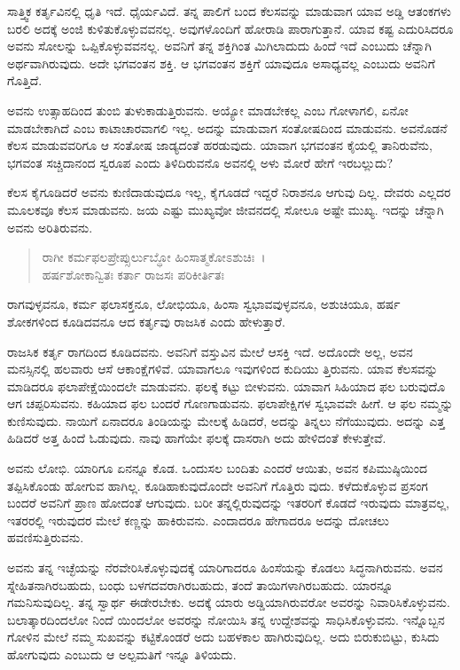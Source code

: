 ಸಾತ್ತ್ವಿಕ ಕರ್ತೃವಿನಲ್ಲಿ ಧೃತಿ ಇದೆ. ಧೈರ್ಯವಿದೆ. ತನ್ನ ಪಾಲಿಗೆ ಬಂದ ಕೆಲಸವನ್ನು ಮಾಡುವಾಗ ಯಾವ ಅಡ್ಡಿ ಆತಂಕಗಳು ಬರಲಿ ಅದಕ್ಕೆ ಅಂಜಿ ಕುಳಿತುಕೊಳ್ಳುವವನಲ್ಲ. ಅವುಗಳೊಂದಿಗೆ ಹೋರಾಡಿ ಪಾರಾಗುತ್ತಾನೆ. ಯಾವ ಕಷ್ಟ ಎದುರಿಸಿದರೂ ಅವನು ಸೋಲನ್ನು ಒಪ್ಪಿಕೊಳ್ಳುವವನಲ್ಲ. ಅವನಿಗೆ ತನ್ನ ಶಕ್ತಿಗಿಂತ ಮಿಗಿಲಾದುದು ಹಿಂದೆ ಇದೆ ಎಂಬುದು ಚೆನ್ನಾಗಿ ಅರ್ಥವಾಗಿರುವುದು. ಅದೇ ಭಗವಂತನ ಶಕ್ತಿ. ಆ ಭಗವಂತನ ಶಕ್ತಿಗೆ ಯಾವುದೂ ಅಸಾಧ್ಯವಲ್ಲ ಎಂಬುದು ಅವನಿಗೆ ಗೊತ್ತಿದೆ.

ಅವನು ಉತ್ಸಾಹದಿಂದ ತುಂಬಿ ತುಳುಕಾಡುತ್ತಿರುವನು. ಅಯ್ಯೋ ಮಾಡಬೇಕಲ್ಲ ಎಂಬ ಗೋಳಾಗಲಿ, ಏನೋ ಮಾಡಬೇಕಾಗಿದೆ ಎಂಬ ಕಾಟಾಚಾರವಾಗಲಿ ಇಲ್ಲ. ಅದನ್ನು ಮಾಡುವಾಗ ಸಂತೋಷದಿಂದ ಮಾಡುವನು. ಅವನೊಡನೆ ಕೆಲಸ ಮಾಡುವವರಿಗೂ ಆ ಸಂತೋಷ ಜಾಡ್ಯದಂತೆ ಹರಡುವುದು. ಯಾವಾಗ ಭಗವಂತನ ಕೈಯಲ್ಲಿ ತಾನಿರುವೆನು, ಭಗವಂತ ಸಚ್ಚಿದಾನಂದ ಸ್ವರೂಪ ಎಂದು ತಿಳಿದಿರುವನೊ ಅವನಲ್ಲಿ ಅಳು ಮೋರೆ ಹೇಗೆ ಇರಬಲ್ಲುದು?

ಕೆಲಸ ಕೈಗೂಡಿದರೆ ಅವನು ಕುಣಿದಾಡುವುದೂ ಇಲ್ಲ, ಕೈಗೂಡದೆ ಇದ್ದರೆ ನಿರಾಶನೂ ಆಗುವು ದಿಲ್ಲ. ದೇವರು ಎಲ್ಲದರ ಮೂಲಕವೂ ಕೆಲಸ ಮಾಡುವನು. ಜಯ ಎಷ್ಟು ಮುಖ್ಯವೋ ಜೀವನದಲ್ಲಿ ಸೋಲೂ ಅಷ್ಟೇ ಮುಖ್ಯ. ಇದನ್ನು ಚೆನ್ನಾಗಿ ಅವನು ಅರಿತಿರುವನು.

\begin{verse}
ರಾಗೀ ಕರ್ಮಫಲಪ್ರೇಪ್ಸುರ್ಲುಬ್ಧೋ ಹಿಂಸಾತ್ಮಕೋಽಶುಚಿಃ~।\\ಹರ್ಷಶೋಕಾನ್ವಿತಃ ಕರ್ತಾ ರಾಜಸಃ ಪರಿಕೀರ್ತಿತಃ 
\end{verse}

{\small ರಾಗವುಳ್ಳವನೂ, ಕರ್ಮ ಫಲಾಸಕ್ತನೂ, ಲೋಭಿಯೂ, ಹಿಂಸಾ ಸ್ವಭಾವವುಳ್ಳವನೂ, ಅಶುಚಿಯೂ, ಹರ್ಷ ಶೋಕಗಳಿಂದ ಕೂಡಿದವನೂ ಆದ ಕರ್ತೃವು ರಾಜಸಿಕ ಎಂದು ಹೇಳುತ್ತಾರೆ.}

ರಾಜಸಿಕ ಕರ್ತೃ ರಾಗದಿಂದ ಕೂಡಿದವನು. ಅವನಿಗೆ ವಸ್ತುವಿನ ಮೇಲೆ ಆಸಕ್ತಿ ಇದೆ. ಅದೊಂದೇ ಅಲ್ಲ, ಅವನ ಮನಸ್ಸಿನಲ್ಲಿ ಹಲವಾರು ಆಸೆ ಆಕಾಂಕ್ಷೆಗಳಿವೆ. ಯಾವಾಗಲೂ ಇವುಗಳಿಂದ ಕುದಿಯು ತ್ತಿರುವನು. ಯಾವ ಕೆಲಸವನ್ನು ಮಾಡಿದರೂ ಫಲಾಪೇಕ್ಷೆಯಿಂದಲೇ ಮಾಡುವನು. ಫಲಕ್ಕೆ ಕಟ್ಟು ಬೀಳುವನು. ಯಾವಾಗ ಸಿಹಿಯಾದ ಫಲ ಬರುವುದೊ ಆಗ ಚಪ್ಪರಿಸುವನು. ಕಹಿಯಾದ ಫಲ ಬಂದರೆ ಗೊಣಗಾಡುವನು. ಫಲಾಪೇಕ್ಷಿಗಳ ಸ್ವಭಾವವೇ ಹೀಗೆ. ಆ ಫಲ ನಮ್ಮನ್ನು ಕುಣಿಸುವುದು. ನಾಯಿಗೆ ಏನಾದರೂ ತಿಂಡಿಯನ್ನು ಮೇಲಕ್ಕೆ ಹಿಡಿದರೆ, ಅದನ್ನು ತಿನ್ನಲು ನೆಗೆಯುವುದು. ಅದನ್ನು ಎತ್ತ ಹಿಡಿದರೆ ಅತ್ತ ಹಿಂದೆ ಓಡುವುದು. ನಾವು ಹಾಗೆಯೇ ಫಲಕ್ಕೆ ದಾಸರಾಗಿ ಅದು ಹೇಳಿದಂತೆ ಕೇಳುತ್ತೇವೆ.

ಅವನು ಲೋಭಿ. ಯಾರಿಗೂ ಏನನ್ನೂ ಕೊಡ. ಒಂದುಸಲ ಬಂದಿತು ಎಂದರೆ ಆಯಿತು, ಅವನ ಕಪಿಮುಷ್ಠಿಯಿಂದ ತಪ್ಪಿಸಿಕೊಂಡು ಹೋಗುವ ಹಾಗಿಲ್ಲ. ಕೂಡಿಹಾಕುವುದೊಂದೇ ಅವನಿಗೆ ಗೊತ್ತಿರು ವುದು. ಕಳೆದುಕೊಳ್ಳುವ ಪ್ರಸಂಗ ಬಂದರೆ ಅವನಿಗೆ ಪ್ರಾಣ ಹೋದಂತೆ ಆಗುವುದು. ಬರೀ ತನ್ನಲ್ಲಿರುವುದನ್ನು ಇತರರಿಗೆ ಕೊಡದೆ ಇರುವುದು ಮಾತ್ರವಲ್ಲ, ಇತರರಲ್ಲಿ ಇರುವುದರ ಮೇಲೆ ಕಣ್ಣನ್ನು ಹಾಕಿರುವನು. ಎಂದಾದರೂ ಹೇಗಾದರೂ ಅದನ್ನು ದೋಚಲು ಹವಣಿಸುತ್ತಿರುವನು.

ಅವನು ತನ್ನ ಇಚ್ಛೆಯನ್ನು ನೆರವೇರಿಸಿಕೊಳ್ಳುವುದಕ್ಕೆ ಯಾರಿಗಾದರೂ ಹಿಂಸೆಯನ್ನು ಕೊಡಲು ಸಿದ್ಧನಾಗಿರುವನು. ಅವನ ಸ್ನೇಹಿತನಾಗಿರಬಹುದು, ಬಂಧು ಬಳಗದವರಾಗಿರಬಹುದು, ತಂದೆ ತಾಯಿಗಳಾಗಿರಬಹುದು. ಯಾರನ್ನೂ ಗಮನಿಸುವುದಿಲ್ಲ. ತನ್ನ ಸ್ವಾರ್ಥ ಈಡೇರಬೇಕು. ಅದಕ್ಕೆ ಯಾರು ಅಡ್ಡಿಯಾಗಿರುವರೋ ಅವರನ್ನು ನಿವಾರಿಸಿಕೊಳ್ಳುವನು. ಬಲಾತ್ಕಾರದಿಂದಲೋ ನಿಂದೆ ಯಿಂದಲೋ ಅವರನ್ನು ನೋಯಿಸಿ ತನ್ನ ಉದ್ದೇಶವನ್ನು ಸಾಧಿಸಿಕೊಳ್ಳುವನು. ಇನ್ನೊಬ್ಬನ ಗೋಳಿನ ಮೇಲೆ ನಮ್ಮ ಸುಖವನ್ನು ಕಟ್ಟಿಕೊಂಡರೆ ಅದು ಬಹಳಕಾಲ ಹಾಗಿರುವುದಿಲ್ಲ. ಅದು ಬಿರುಕುಬಿಟ್ಟು, ಕುಸಿದು ಹೋಗುವುದು ಎಂಬುದು ಆ ಅಲ್ಪಮತಿಗೆ ಇನ್ನೂ ತಿಳಿಯದು.


